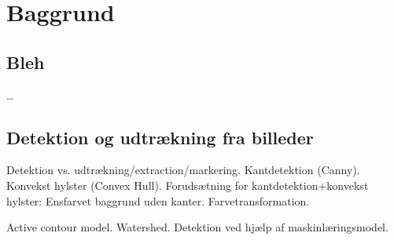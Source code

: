 
\chapter{Baggrund}

\section{Bleh}
\ldots

\section{Detektion og udtrækning fra billeder}
Detektion vs. udtrækning/extraction/markering.
Kantdetektion (Canny).
Konvekst hylster (Convex Hull).
Forudsætning for kantdetektion+konvekst hylster: Ensfarvet baggrund
uden kanter.
Farvetransformation.

Active contour model.
Watershed.
Detektion ved hjælp af maskinlæringsmodel.
